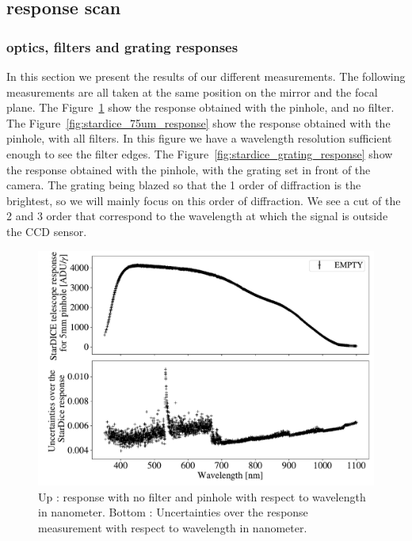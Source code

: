 \subsection{\SD response scan}

\subsubsection{\SD optics, filters and grating responses}

In this section we present the results of our different measurements. The following measurements are all taken at the same position on the mirror and the focal plane. The Figure~\ref{fig:stardice_5mm_response} show the \SD response obtained with the \bpinhole pinhole, and no filter. The Figure~\ref{fig:stardice_75um_response} show the \SD response obtained with the \spinhole pinhole, with all filters. In this figure we have a wavelength resolution sufficient enough to see the filter edges. The Figure~\ref{fig:stardice_grating_response} show the \SD response obtained with the \spinhole pinhole, with the grating set in front of the camera. The grating being blazed so that the 1 order of diffraction is the brightest, so we will mainly focus on this order of diffraction. We see a cut of the 2 and 3 order that correspond to the wavelength at which the signal is outside the CCD sensor.

\begin{figure}[h]
    \centering
    \includegraphics[width=\columnwidth]{fig/stardice_5mm_response.pdf}
    \caption{Up : \SD response with no filter and \bpinhole pinhole with respect to wavelength in nanometer. Bottom : Uncertainties over the \SD response measurement with respect to wavelength in nanometer.}
    \label{fig:stardice_5mm_response}
\end{figure}

